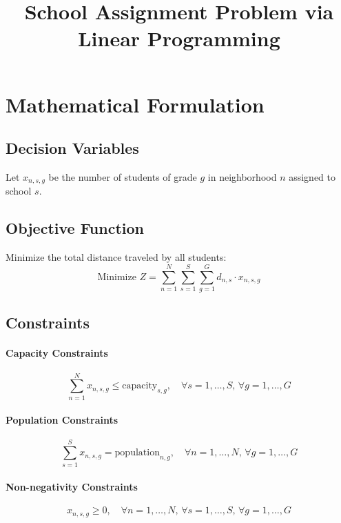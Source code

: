 \documentclass{article}
\begin{document}
\title{School Assignment Problem via Linear Programming}
\author{}
\date{}
\maketitle

\section*{Mathematical Formulation}

\subsection*{Decision Variables}
Let \( x_{n,s,g} \) be the number of students of grade \( g \) in neighborhood \( n \) assigned to school \( s \).

\subsection*{Objective Function}
Minimize the total distance traveled by all students:
\[
\text{Minimize } Z = \sum_{n=1}^{N} \sum_{s=1}^{S} \sum_{g=1}^{G} d_{n,s} \cdot x_{n,s,g}
\]

\subsection*{Constraints}

\paragraph{Capacity Constraints}
\[
\sum_{n=1}^{N} x_{n,s,g} \leq \text{capacity}_{s,g}, \quad \forall s = 1, \ldots, S, \, \forall g = 1, \ldots, G
\]

\paragraph{Population Constraints}
\[
\sum_{s=1}^{S} x_{n,s,g} = \text{population}_{n,g}, \quad \forall n = 1, \ldots, N, \, \forall g = 1, \ldots, G
\]

\paragraph{Non-negativity Constraints}
\[
x_{n,s,g} \geq 0, \quad \forall n = 1, \ldots, N, \, \forall s = 1, \ldots, S, \, \forall g = 1, \ldots, G
\]
\end{document}
